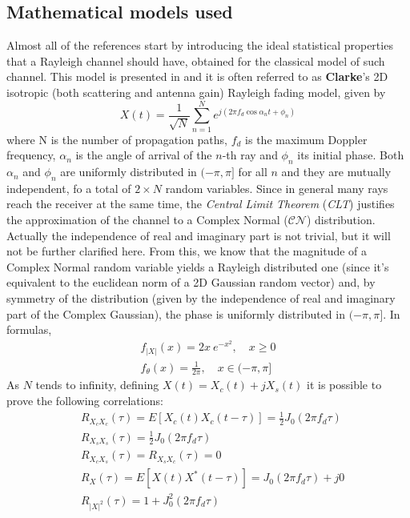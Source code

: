 \subsection{Mathematical models used} %
\label{subsec:math_models}

Almost all of the references start by introducing the ideal statistical properties that a Rayleigh channel should have, obtained for the classical model of such channel. This model is presented in \cite{clarke} and it is often referred to as \textbf{Clarke}'s 2D isotropic (both scattering and antenna gain) Rayleigh fading model, given by%
%
\begin{equation}
X(t) = \frac{1}{\sqrt{N}} \sum_{n=1}^{N} e^{j(2\pi f_d \cos \alpha_n t + \phi_n)}
\end{equation}%
%
where N is the number of propagation paths, $f_d$ is the maximum Doppler frequency, $\alpha_n$ is the angle of arrival of the $n$-th ray and $\phi_n$ its initial phase. Both $\alpha_n$ and $\phi_n$ are uniformly distributed in $(-\pi,\pi]$ for all $n$ and they are mutually independent, fo a total of $2 \times N$ random variables. Since in general many rays reach the receiver at the same time, the \textit{Central Limit Theorem} (\textit{CLT}) justifies the approximation of the channel to a Complex Normal ($\mathcal{CN}$) distribution. Actually the independence of real and imaginary part is not trivial, but it will not be further clarified here. From this, we know that the magnitude of a Complex Normal random variable yields a Rayleigh distributed one (since it's equivalent to the euclidean norm of a 2D Gaussian random vector) and, by symmetry of the distribution (given by the independence of real and imaginary part of the Complex Gaussian), the phase is uniformly distributed in $(-\pi,\pi]$. In formulas,%
%
\begin{subequations}
\begin{align}
	f_{|X|}(x) = 2x \ e^{-x^2}, \quad x \geq 0\\
	f_{\theta}(x) = \frac{1}{2\pi}, \quad x \in (-\pi,\pi]
\end{align}
\end{subequations}%
%
As $N$ tends to infinity, defining $X(t) = X_c(t) + jX_s(t)$ it is possible to prove the following correlations:%
%
\begin{subequations}
	\label{eqs:correlations}
\begin{align}
&R_{X_cX_c}(\tau) = E[X_c(t)X_c(t-\tau)] = \frac{1}{2} J_0(2\pi f_d\tau)\\
&R_{X_sX_s}(\tau) = \frac{1}{2} J_0(2\pi f_d\tau)\\
&R_{X_cX_s}(\tau) = R_{X_sX_c}(\tau) = 0\\
&R_X(\tau) = E[X(t) X^*(t-\tau)] = J_0(2\pi f_d \tau) + j0\\
&R_{|X|^2}(\tau) = 1 + J_0^2(2\pi f_d \tau)
\end{align}
\end{subequations}%
